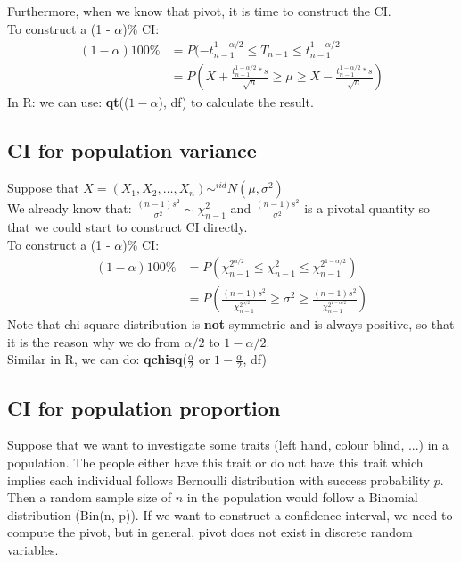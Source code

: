 \documentclass[12pt ]{article}
\begin{document}
Furthermore, when we know that pivot, it is time to construct the CI. \\
To construct a (1 - $\alpha$)\% CI:
\begin{align*}
(1 - \alpha)100\% &= P(-t^{1- \alpha / 2}_{n-1} \leq T_{n-1} \leq t^{1- \alpha / 2}_{n-1} \\
&= P(\bar{X} + \frac{t^{1- \alpha / 2}_{n-1} * s}{\sqrt{n}} \geq \mu \geq \bar{X} - \frac{t^{1- \alpha / 2}_{n-1} * s}{\sqrt{n}})
\end{align*}
In R: we can use: \textbf{qt}(($1-\alpha$), df) to calculate the result.

\subsection{CI for population variance}
Suppose that $X = (X_{1}, X_{2}, \ldots, X_{n}) \sim^{iid} N(\mu, \sigma^2)$ \\
We already know that: $\frac{(n-1)s^2}{\sigma^2} \sim \chi^2_{n-1}$ and $\frac{(n-1)s^2}{\sigma^2}$ is a pivotal quantity so that we could start to construct CI directly.\\
To construct a (1 - $\alpha$)\% CI:
\begin{align*}
(1 - \alpha)100\% &= P(\chi^{2^{\alpha / 2}}_{n-1} \leq \chi^2_{n-1} \leq \chi^{2^{1 - \alpha / 2}}_{n-1}) \\
&= P(\frac{(n-1)s^2}{\chi^{2^{\alpha / 2}}_{n-1}} \geq \sigma^2 \geq \frac{(n-1)s^2}{\chi^{2^{1 - \alpha / 2}}_{n-1}})
\end{align*}
Note that chi-square distribution is \textbf{not} symmetric and is always positive, so that it is the reason why we do from $\alpha / 2$ to $1 - \alpha / 2$. \\
Similar in R, we can do: \textbf{qchisq}($\frac{\alpha}{2}$ or $1 - \frac{\alpha}{2}$, df)

\subsection{CI for population proportion}
Suppose that we want to investigate some traits (left hand, colour blind, ...) in a population. The people either have this trait or do not have this trait which implies each individual follows Bernoulli distribution with success probability $p$. Then a random sample size of $n$ in the population would follow a Binomial distribution (Bin(n, p)). If we want to construct a confidence interval, we need to compute the pivot, but in general, pivot does not exist in discrete random variables. \\
\end{document}
